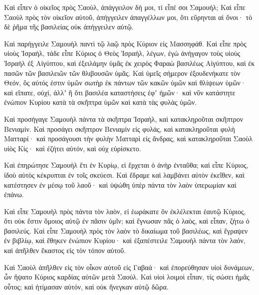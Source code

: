 {Καὶ εἶπεν ὁ οἰκεῖος πρὸς Σαοὺλ, ἀπάγγειλον δή μοι, τί εἶπέ σοι Σαμουήλ;
Καὶ εἶπε Σαοὺλ πρὸς τὸν οἰκεῖον αὐτοῦ, ἀπήγγειλεν ἀπαγγέλλων μοι, ὅτι εὕρηνται αἱ ὄνοι· τὸ δὲ ῥῆμα τῆς βασιλείας οὐκ ἀπήγγειλεν αὐτῷ.
\par }{\PP {}Καὶ παρήγγειλε Σαμουὴλ παντὶ τῷ λαῷ πρὸς Κύριον εἰς Μασσηφάθ.
Καὶ εἶπε πρὸς υἱοὺς Ἰσραὴλ, τάδε εἶπε Κύριος ὁ Θεὸς Ἰσραὴλ, λέγων, ἐγὼ ἀνήγαγον τοὺς υἱοὺς Ἰσραὴλ ἐξ Αἰγύπτου, καὶ ἐξειλάμην ὑμᾶς ἐκ χειρὸς Φαραὼ βασιλέως Αἰγύπτου, καὶ ἐκ πασῶν τῶν βασιλειῶν τῶν θλιβουσῶν ὑμᾶς.
Καὶ ὑμεῖς σήμερον ἐξουδενήκατε τὸν Θεόν, ὃς αὐτός ἐστιν ὑμῶν σωτὴρ ἐκ πάντων τῶν κακῶν ὑμῶν καὶ θλίψεων ὑμῶν· καὶ εἴπατε, οὐχί, ἀλλʼ ἢ ὅτι βασιλέα καταστήσεις ἐφʼ ἡμῶν· καὶ νῦν κατάστητε ἐνώπιον Κυρίου κατὰ τὰ σκῆπτρα ὑμῶν καὶ κατὰ τὰς φυλὰς ὑμῶν.
\par }{\PP {}Καὶ προσήγαγε Σαμουὴλ πάντα τὰ σκῆπτρα Ἰσραὴλ, καὶ κατακληροῦται σκῆπτρον Βενιαμίν.
Καὶ προσάγει σκῆπτρον Βενιαμὶν εἰς φυλάς, καὶ κατακληροῦται φυλὴ Ματταρί· καὶ προσάγουσι τὴν φυλὴν Ματταρὶ εἰς ἄνδρας, καὶ κατακληροῦται Σαοὺλ υἱὸς Κίς· καὶ ἐζήτει αὐτόν, καὶ οὐχ εὑρίσκετο.
\par }{\PP {}Καὶ ἐπηρώτησε Σαμουὴλ ἔτι ἐν Κυρίῳ, εἰ ἔρχεται ὁ ἀνὴρ ἐνταῦθα; καὶ εἶπε Κύριος, ἰδοὺ αὐτὸς κέκρυπται ἐν τοῖς σκεύεσι.
Καὶ ἔδραμε καὶ λαμβάνει αὐτὸν ἐκεῖθεν, καὶ κατέστησεν ἐν μέσῳ τοῦ λαοῦ· καὶ ὑψώθη ὑπὲρ πάντα τὸν λαὸν ὑπερωμίαν καὶ ἐπάνω.
\par }{\PP {}Καὶ εἶπε Σαμουὴλ πρὸς πάντα τὸν λαὸν, εἰ ἑωράκατε ὃν ἐκλέλεκται ἑαυτῷ Κύριος, ὅτι οὐκ ἔστιν ὅμοιος αὐτῷ ἐν πᾶσιν ὑμῖν; καὶ ἔγνωσαν πᾶς ὁ λαὸς, καὶ εἶπαν, ζήτω ὁ βασιλεύς.
Καὶ εἶπε Σαμουὴλ πρὸς τὸν λαὸν τὸ δικαίωμα τοῦ βασιλέως, καὶ ἔγραψεν ἐν βιβλίῳ, καὶ ἔθηκεν ἐνώπιον Κυρίου· καὶ ἐξαπέστειλε Σαμουὴλ πάντα τὸν λαόν, καὶ ἀπῆλθεν ἕκαστος εἰς τὸν τόπον αὐτοῦ.
\par }{\PP {}Καὶ Σαοὺλ ἀπῆλθεν εἰς τὸν οἶκον αὐτοῦ εἰς Γαβαά· καὶ ἐπορεύθησαν υἱοὶ δυνάμεων, ὧν ἥψατο Κύριος καρδίας αὐτῶν μετὰ Σαούλ.
Καὶ υἱοὶ λοιμοὶ εἶπαν, τίς σώσει ἡμᾶς οὗτος; καὶ ἠτίμασαν αὐτόν, καὶ οὐκ ἤνεγκαν αὐτῷ δῶρα.

}
